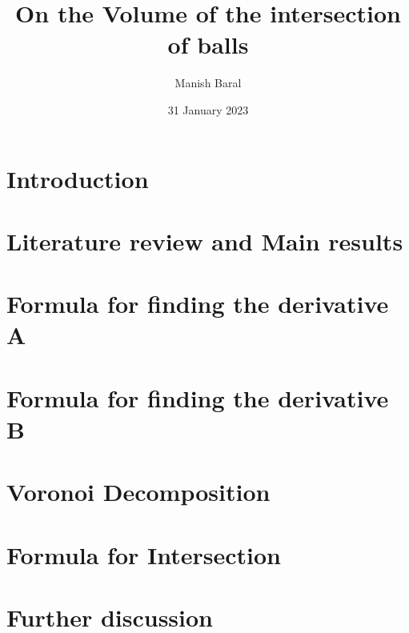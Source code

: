 \documentclass[12pt]{report}
\title{On the Volume of the intersection of balls}
\author{Manish Baral}
\date{31 January 2023}
\begin{document}




\tableofcontents

\chapter{Introduction}


\chapter{Literature review and Main results}


\chapter{Formula for finding the derivative A}



\chapter{Formula for finding the derivative B}


\chapter{Voronoi Decomposition}


\chapter{Formula for Intersection}



\chapter{Further discussion}

\end{document}

